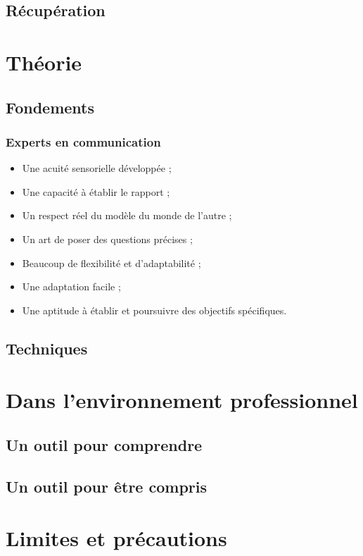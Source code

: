 \documentclass{beamer}
\begin{document}
\subsection{Récupération}

\section{Théorie}
\subsection{Fondements}
\begin{frame}[t]\frametitle{Experts en communication}
	\begin{itemize}
		\item<+-> Une acuité sensorielle développée ;
		\item<+-> Une capacité à établir le rapport ;
		\item<+-> Un respect réel du modèle du monde de l'autre ;
		\item<+-> Un art de poser des questions précises ;
		\item<+-> Beaucoup de flexibilité et d'adaptabilité ;
		\item<+-> Une adaptation facile ;
		\item<+-> Une aptitude à établir et poursuivre des objectifs spécifiques.
	\end{itemize}
\end{frame}
\subsection{Techniques}

\section{Dans l'environnement professionnel}
\subsection{Un outil pour comprendre}
\subsection{Un outil pour être compris}

\section{Limites et précautions}
\end{document}
